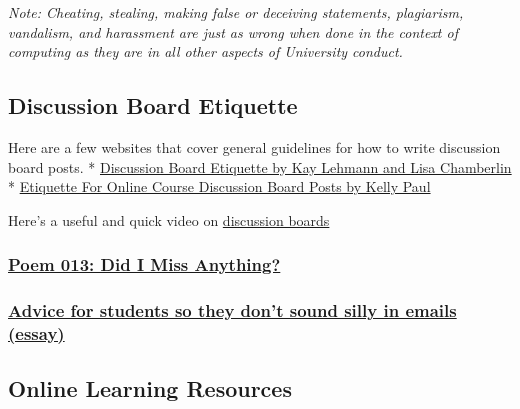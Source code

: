 \documentclass[
]{book}
\begin{document}
\emph{Note: Cheating, stealing, making false or deceiving statements, plagiarism, vandalism, and harassment are just as wrong when done in the context of computing as they are in all other aspects of University conduct.}

\hypertarget{discussion-board-etiquette}{%
\subsection{Discussion Board Etiquette}\label{discussion-board-etiquette}}

Here are a few websites that cover general guidelines for how to write discussion board posts.
* \href{https://www2.uwstout.edu/content/profdev/rubrics/discuss_etiquette.html}{Discussion Board Etiquette by Kay Lehmann and Lisa Chamberlin}
* \href{http://learnmore.uncg.edu/blog/etiquette-for-online-course-discussion-boards}{Etiquette For Online Course Discussion Board Posts by Kelly Paul}

Here's a useful and quick video on \href{https://www.youtube.com/watch?v=tg3y2A9pdtI}{discussion boards}

\hypertarget{poem-013-did-i-miss-anything}{%
\subsubsection{\texorpdfstring{\href{https://www.loc.gov/programs/poetry-and-literature/poet-laureate/poet-laureate-projects/poetry-180/all-poems/item/poetry-180-013/did-i-miss-anything/}{Poem 013: Did I Miss Anything?}}{Poem 013: Did I Miss Anything?}}\label{poem-013-did-i-miss-anything}}

\hypertarget{advice-for-students-so-they-dont-sound-silly-in-emails-essay}{%
\subsubsection{\texorpdfstring{\href{https://www.insidehighered.com/views/2015/04/16/advice-students-so-they-dont-sound-silly-emails-essay}{Advice for students so they don't sound silly in emails (essay)}}{Advice for students so they don't sound silly in emails (essay)}}\label{advice-for-students-so-they-dont-sound-silly-in-emails-essay}}

\hypertarget{online-learning-resources}{%
\subsection{Online Learning Resources}\label{online-learning-resources}}
\end{document}
